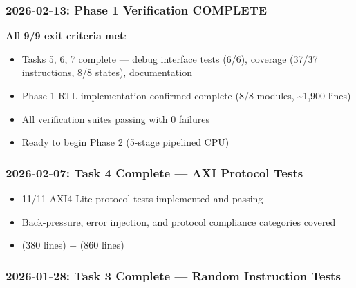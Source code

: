 \subsubsection{\texorpdfstring{2026-02-13: Phase 1 Verification COMPLETE
\ok{}}{2026-02-13: Phase 1 Verification COMPLETE }}\label{cr:status:phase-status:2026-02-13-phase-1-verification-complete-tada}

\begin{record}

\textbf{All 9/9 exit criteria met}:

\begin{itemize}
\tightlist
\item
  \ok{} Tasks 5, 6, 7 complete --- debug interface tests (6/6), coverage
  (37/37 instructions, 8/8 states), documentation
\item
  \ok{} Phase 1 RTL implementation confirmed complete (8/8 modules,
  \textasciitilde1,900 lines)
\item
  \ok{} All verification suites passing with 0 failures
\item
  \ok{} Ready to begin Phase 2 (5-stage pipelined CPU)
\end{itemize}

\end{record}

\subsubsection{\texorpdfstring{2026-02-07: Task 4 Complete --- AXI
Protocol Tests
\ok{}}{2026-02-07: Task 4 Complete --- AXI Protocol Tests }}\label{cr:status:phase-status:2026-02-07-task-4-complete-axi-protocol-tests-tada}

\begin{record}

\begin{itemize}
\tightlist
\item
  \ok{} 11/11 AXI4-Lite protocol tests implemented and passing
\item
  \ok{} Back-pressure, error injection, and protocol compliance
  categories covered
\item
  \ok{}  (380 lines) +
   (860 lines)
\end{itemize}

\end{record}

\subsubsection{\texorpdfstring{2026-01-28: Task 3 Complete --- Random
Instruction Tests
\ok{}}{2026-01-28: Task 3 Complete --- Random Instruction Tests }}\label{cr:status:phase-status:2026-01-28-task-3-complete-random-instruction-tests-tada}


